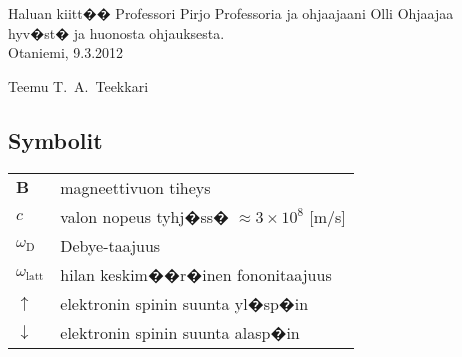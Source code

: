 \documentclass[finnish,12pt,a4paper,pdftex]{article}
\begin{document}
Haluan kiitt�� Professori Pirjo 
Professoria ja ohjaajaani Olli Ohjaajaa hyv�st� ja 
huonosta ohjauksesta.\\

\vspace{5cm}
Otaniemi, 9.3.2012

\vspace{5mm}
{\hfill Teemu T.\ A.\ Teekkari \hspace{1cm}}

\newpage


\tableofcontents


\subsection*{Symbolit}

\begin{tabular}{ll}
$\mathbf{B}$  & magneettivuon tiheys  \\
$c$              & valon nopeus tyhj�ss� $\approx 3\times10^8$ [m/s]\\
$\omega_{\mathrm{D}}$    & Debye-taajuus \\
$\omega_{\mathrm{latt}}$ & hilan keskim��r�inen fononitaajuus \\
$\uparrow$       & elektronin spinin suunta yl�sp�in\\
$\downarrow$     & elektronin spinin suunta alasp�in
\end{tabular}
\end{document}
